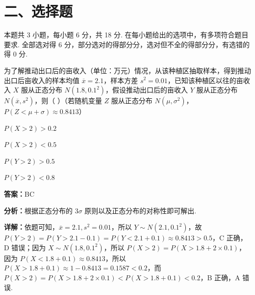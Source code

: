 \section*{二、选择题}
本题共 3 小题，每小题 6 分，共 18 分. 在每小题给出的选项中，有多项符合题目要求. 全部选对得 6 分，部分选对的得部分分，选对但不全的得部分分，有选错的得 0 分.

\begin{question}[points=6]
为了解推动出口后的亩收入（单位：万元）情况，从该种植区抽取样本，得到推动出口后亩收入的样本均值 $\overline{x}=2.1$，样本方差 $s^2=0.01$，已知该种植区以往的亩收入 $X$ 服从正态分布 $N(1.8,0.1^2)$，假设推动出口后的亩收入 $Y$ 服从正态分布 $N(\overline{x},s^2)$，则（ ）（若随机变量 $Z$ 服从正态分布 $N(\mu,\sigma^2)$，$P(Z<\mu+\sigma)\approx 0.8413$）
\begin{choices}
  \item $P(X>2)>0.2$
  \item $P(X>2)<0.5$
  \item $P(Y>2)>0.5$
  \item $P(Y>2)<0.8$
\end{choices}
\begin{solution}
\textbf{答案：}BC

\textbf{分析：}根据正态分布的 $3\sigma$ 原则以及正态分布的对称性即可解出.

\textbf{详解：}依题可知，$\overline{x}=2.1, s^2=0.01$，所以 $Y\sim N(2.1,0.1^2)$，故 $P(Y>2)=P(Y>2.1-0.1)=P(Y<2.1+0.1)\approx 0.8413>0.5$，C 正确，D 错误；因为 $X\sim N(1.8,0.1^2)$，所以 $P(X>2)=P(X>1.8+2\times0.1)$，因为 $P(X<1.8+0.1)\approx 0.8413$，所以 $P(X>1.8+0.1)\approx 1-0.8413=0.1587<0.2$，而 $P(X>2)=P(X>1.8+2\times0.1)<P(X>1.8+0.1)<0.2$，B 正确，A 错误.
\end{solution}
\end{question}

